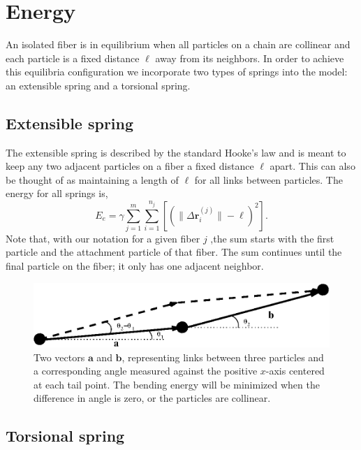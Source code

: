 \section{Energy}

	An isolated fiber is in equilibrium when all particles on a chain are collinear and each particle is a fixed distance $\ell$ away from its neighbors. In order to achieve this equilibria configuration we incorporate two types of springs into the model: an extensible spring and a torsional spring.

\subsection{Extensible spring}

	The extensible spring is described by the standard Hooke's law and is meant to keep any two adjacent particles on a fiber a fixed distance $\ell$ apart. This can also be thought of as maintaining a length of $\ell$ for all links between particles. The energy for all springs is,
\begin{equation}
	E_e = \gamma \sum_{j=1}^m \sum_{i=1}^{n_j} \left[ \left( \|\Delta \textbf{r}_i^{(j)} \| - \ell \right)^2 \right].
\end{equation}
Note that, with our notation for a given fiber $j$ ,the sum starts with the first particle and the attachment particle of that fiber. The sum continues until the final particle on the fiber; it only has one adjacent neighbor.

	\begin{figure}
		\begin{center}
			\includegraphics[scale=1]{./old_fig/BendingEnergy.eps}
		\end{center}		
		\caption{Two vectors $\textbf{a}$ and $\textbf{b}$, representing links between three particles and a corresponding angle measured against the positive $x$-axis centered at each tail point. The bending energy will be minimized when the difference in angle is zero, or the particles are collinear.
		\label{fig:BendingEnergy}}
	\end{figure}	

\subsection{Torsional spring}

